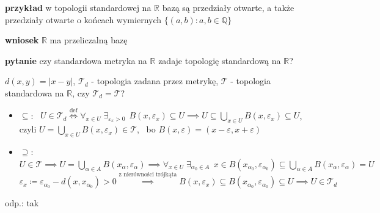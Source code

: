 \documentclass[a4paper,12pt]{article}
\begin{document}
\bigskip
\begin{logbox}
\textbf{przykład} \; w topologii standardowej na \(\mathbb{R}\) bazą są przedziały otwarte, a także przedziały otwarte o końcach wymiernych \(\{(a, b) : a, b \in \mathbb{Q}\}\)
\end{logbox}

\smallskip
\textbf{wniosek} \; \(\mathbb{R}\) ma przeliczalną bazę

\bigskip
\textbf{pytanie} \; czy standardowa metryka na \(\mathbb{R}\) zadaje topologię standardową na \(\mathbb{R}\)?

\smallskip
\(d(x, y) = |x - y|\), \; \(\mathcal{T}_d\) - topologia zadana przez metrykę, \; \(\mathcal{T}\) - topologia standardowa na \(\mathbb{R}\), \; czy \(\mathcal{T}_d = \mathcal{T}\)?
\begin{itemize}
    \item \(\subseteq\): \, \(U \in \mathcal{T}_d \overset{\text{def}}{\iff} \forall_{x \in U} \; \exists_{\varepsilon_x > 0} \;\, B(x, \varepsilon_x) \subseteq U \implies U \subseteq \bigcup_{x \in U} B(x, \varepsilon_x) \subseteq U\), \, czyli \(U = \bigcup_{x \in U} B(x, \varepsilon_x) \in \mathcal{T}\), \, bo \(B(x, \varepsilon) = (x - \varepsilon, x + \varepsilon)\)
    \item \(\supseteq\): \, \(U \in \mathcal{T} \implies U = \bigcup_{\alpha \in A} B(x_\alpha, \varepsilon_\alpha) \implies \forall_{x \in U} \; \exists_{\alpha_0 \in A} \;\, x \in B(x_{\alpha_0}, \varepsilon_{\alpha_0}) \subseteq \bigcup_{\alpha \in A} B(x_\alpha, \varepsilon_\alpha) = U\) \\
    \(\varepsilon_x \coloneqq \varepsilon_{\alpha_0} - d(x, x_{\alpha_0}) > 0 \overset{\text{z nierówności trójkąta}}{\implies} B(x, \varepsilon_x) \subseteq B(x_{\alpha_0}, \varepsilon_{\alpha_0}) \subseteq U \implies U \in \mathcal{T}_d\)
\end{itemize}

\smallskip
odp.: tak
\end{document}
